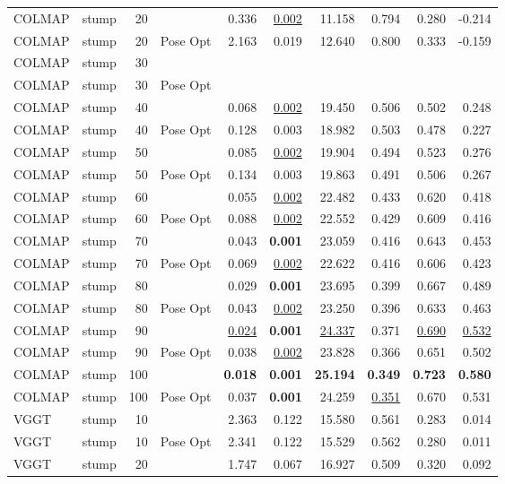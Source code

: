 \begin{table}[H]
\begin{tabular}{llrlrrrrrr}
COLMAP & stump & 20 &  & 0.336 & \underline{0.002} & 11.158 & 0.794 & 0.280 & -0.214 \\
COLMAP & stump & 20 & Pose Opt & 2.163 & 0.019 & 12.640 & 0.800 & 0.333 & -0.159 \\
COLMAP & stump & 30 &  &  &  &  &  &  &  \\
COLMAP & stump & 30 & Pose Opt &  &  &  &  &  &  \\
COLMAP & stump & 40 &  & 0.068 & \underline{0.002} & 19.450 & 0.506 & 0.502 & 0.248 \\
COLMAP & stump & 40 & Pose Opt & 0.128 & 0.003 & 18.982 & 0.503 & 0.478 & 0.227 \\
COLMAP & stump & 50 &  & 0.085 & \underline{0.002} & 19.904 & 0.494 & 0.523 & 0.276 \\
COLMAP & stump & 50 & Pose Opt & 0.134 & 0.003 & 19.863 & 0.491 & 0.506 & 0.267 \\
COLMAP & stump & 60 &  & 0.055 & \underline{0.002} & 22.482 & 0.433 & 0.620 & 0.418 \\
COLMAP & stump & 60 & Pose Opt & 0.088 & \underline{0.002} & 22.552 & 0.429 & 0.609 & 0.416 \\
COLMAP & stump & 70 &  & 0.043 & \textbf{0.001} & 23.059 & 0.416 & 0.643 & 0.453 \\
COLMAP & stump & 70 & Pose Opt & 0.069 & \underline{0.002} & 22.622 & 0.416 & 0.606 & 0.423 \\
COLMAP & stump & 80 &  & 0.029 & \textbf{0.001} & 23.695 & 0.399 & 0.667 & 0.489 \\
COLMAP & stump & 80 & Pose Opt & 0.043 & \underline{0.002} & 23.250 & 0.396 & 0.633 & 0.463 \\
COLMAP & stump & 90 &  & \underline{0.024} & \textbf{0.001} & \underline{24.337} & 0.371 & \underline{0.690} & \underline{0.532} \\
COLMAP & stump & 90 & Pose Opt & 0.038 & \underline{0.002} & 23.828 & 0.366 & 0.651 & 0.502 \\
COLMAP & stump & 100 &  & \textbf{0.018} & \textbf{0.001} & \textbf{25.194} & \textbf{0.349} & \textbf{0.723} & \textbf{0.580} \\
COLMAP & stump & 100 & Pose Opt & 0.037 & \textbf{0.001} & 24.259 & \underline{0.351} & 0.670 & 0.531 \\
VGGT & stump & 10 &  & 2.363 & 0.122 & 15.580 & 0.561 & 0.283 & 0.014 \\
VGGT & stump & 10 & Pose Opt & 2.341 & 0.122 & 15.529 & 0.562 & 0.280 & 0.011 \\
VGGT & stump & 20 &  & 1.747 & 0.067 & 16.927 & 0.509 & 0.320 & 0.092 \\

\end{tabular}
\end{table}
